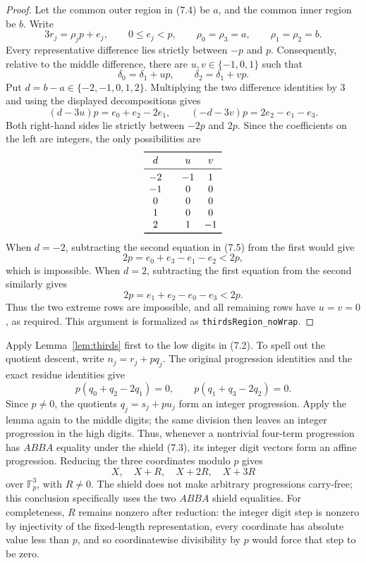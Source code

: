 \documentclass[11pt]{article}
\theoremstyle{definition}
\newcommand{\F}{\mathbb F}
\newcommand{\leanname}[1]{\texttt{#1}}
\begin{document}
\begin{proof}
Let the common outer region in (7.4) be \(a\), and the common inner region
be \(b\).  Write
\[
 3r_j=\rho_jp+e_j,
 \qquad 0\leq e_j<p,
 \qquad
 \rho_0=\rho_3=a,\qquad \rho_1=\rho_2=b.
\]
Every representative difference lies strictly between \(-p\) and \(p\).
Consequently, relative to the middle difference, there are
\(u,v\in\{-1,0,1\}\) such that
\[
 \delta_0=\delta_1+up,
 \qquad
 \delta_2=\delta_1+vp.
\]
Put \(d=b-a\in\{-2,-1,0,1,2\}\).  Multiplying the two difference
identities by \(3\) and using the displayed decompositions gives
\[
 (d-3u)p=e_0+e_2-2e_1,
 \qquad
 (-d-3v)p=2e_2-e_1-e_3.
 \tag{7.5}
\]
Both right-hand sides lie strictly between \(-2p\) and \(2p\).  Since the
coefficients on the left are integers, the only possibilities are
\[
\begin{array}{c@{\qquad}cc}
\toprule
d&u&v\\
\midrule
-2&-1&1\\
-1&0&0\\
0&0&0\\
1&0&0\\
2&1&-1\\
\bottomrule
\end{array}
\]
When \(d=-2\), subtracting the second equation in (7.5) from the first
would give
\[
 2p=e_0+e_3-e_1-e_2<2p,
\]
which is impossible.  When \(d=2\), subtracting the first equation from the
second similarly gives
\[
 2p=e_1+e_2-e_0-e_3<2p.
\]
Thus the two extreme rows are impossible, and all remaining rows have
\(u=v=0\), as required.  This argument is formalized as
\leanname{thirdsRegion\_noWrap}.
\end{proof}

Apply Lemma~\ref{lem:thirds} first to the low digits in (7.2).  To spell out
the quotient descent, write \(n_j=r_j+pq_j\).  The original progression
identities and the exact residue identities give
\[
 p(q_0+q_2-2q_1)=0,
 \qquad
 p(q_1+q_3-2q_2)=0.
\]
Since \(p\ne0\), the quotients \(q_j=s_j+pu_j\) form an integer
progression.  Apply the lemma again to the middle digits; the same division
then leaves an integer progression in the high digits.  Thus, whenever a
nontrivial four-term progression has \(ABBA\) equality under the shield
(7.3), its integer digit vectors form an affine progression.  Reducing the
three coordinates modulo \(p\) gives
\[
 X,\quad X+R,\quad X+2R,\quad X+3R
 \tag{7.6}
\]
over \(\F_p^3\), with \(R\ne0\).  The shield does not make arbitrary
progressions carry-free; this conclusion specifically uses the two \(ABBA\)
shield equalities.  For completeness, \(R\) remains nonzero after reduction:
the integer digit step is nonzero by injectivity of the fixed-length
representation, every coordinate has absolute value less than \(p\), and so
coordinatewise divisibility by \(p\) would force that step to be zero.
\end{document}

